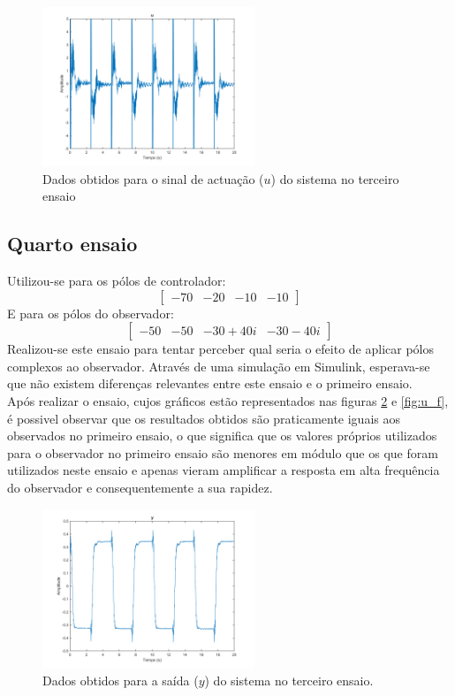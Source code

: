 \documentclass[%
  reprint,
  nofootinbib,
  amsmath,amssymb,
  aps,
  10pt,
  a4paper
]{revtex4-1}
\begin{document}
\begin{figure}
\includegraphics[width=2.5in]{../imgs/dados_00_e/dados_00_e_u.png}
\caption{Dados obtidos para o sinal de actuação ($u$) do sistema no terceiro ensaio}
\label{fig:u_e}
\end{figure}
\subsection{Quarto ensaio}
Utilizou-se para os pólos de controlador:
\begin{equation}
\begin{bmatrix}
-70 & -20 & -10 &-10
\end{bmatrix}
\end{equation}
E para os pólos do observador:
\begin{equation}
\begin{bmatrix}
-50 & -50 & -30+40i &-30-40i
\end{bmatrix}
\end{equation}
Realizou-se este ensaio para tentar perceber qual seria o efeito de aplicar pólos complexos ao observador. Através de uma simulação em Simulink, esperava-se que não existem diferenças relevantes entre este ensaio e o primeiro ensaio.\\
Após realizar o ensaio, cujos gráficos estão representados nas figuras \ref{fig:y_f} e \ref{fig:u_f}, é possivel observar que os resultados obtidos são praticamente iguais aos observados no primeiro ensaio, o que significa que os valores próprios utilizados para o observador no primeiro ensaio são menores em módulo que os que foram utilizados neste ensaio e apenas vieram amplificar a resposta em alta frequência do observador e consequentemente a sua rapidez.
\begin{figure}
\includegraphics[width=2.5in]{../imgs/dados_00_f/dados_00_f_y.png}
\caption{Dados obtidos para a saída ($y$) do sistema no terceiro ensaio.}
\label{fig:y_f}
\end{figure}
\end{document}
